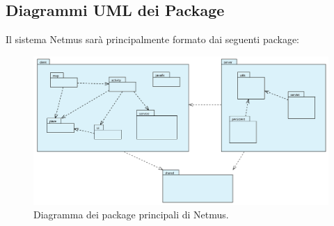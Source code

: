 \newpage
\subsection{Diagrammi UML dei Package}
Il sistema Netmus sar\`a principalmente formato dai seguenti package:
\begin{figure}[h]
  \centering
  \includegraphics[width=16cm]{img/ST/PackageGeneric.png}
\caption{Diagramma dei package principali di Netmus.}
\end{figure}

